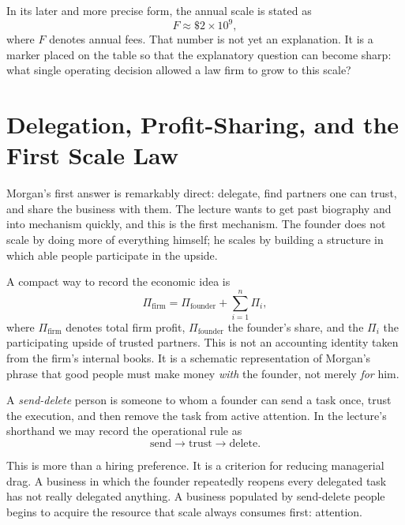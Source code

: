 In its later and more precise form, the annual scale is stated as
\begin{equation}
F \approx \$2 \times 10^9,
\end{equation}
where \(F\) denotes annual fees. That number is not yet an explanation. It is a marker placed on the table so that the explanatory question can become sharp: what single operating decision allowed a law firm to grow to this scale?

\section{Delegation, Profit-Sharing, and the First Scale Law}

Morgan's first answer is remarkably direct: delegate, find partners one can trust, and share the business with them. The lecture wants to get past biography and into mechanism quickly, and this is the first mechanism. The founder does not scale by doing more of everything himself; he scales by building a structure in which able people participate in the upside.

A compact way to record the economic idea is
\begin{equation}
\Pi_{\mathrm{firm}} = \Pi_{\mathrm{founder}} + \sum_{i=1}^{n}\Pi_i,
\end{equation}
where \(\Pi_{\mathrm{firm}}\) denotes total firm profit, \(\Pi_{\mathrm{founder}}\) the founder's share, and the \(\Pi_i\) the participating upside of trusted partners. This is not an accounting identity taken from the firm's internal books. It is a schematic representation of Morgan's phrase that good people must make money \emph{with} the founder, not merely \emph{for} him.

\begin{definition}
A \emph{send-delete} person is someone to whom a founder can send a task once, trust the execution, and then remove the task from active attention. In the lecture's shorthand we may record the operational rule as
\begin{equation}
\text{send} \to \text{trust} \to \text{delete}.
\end{equation}
\end{definition}

This is more than a hiring preference. It is a criterion for reducing managerial drag. A business in which the founder repeatedly reopens every delegated task has not really delegated anything. A business populated by send-delete people begins to acquire the resource that scale always consumes first: attention.

